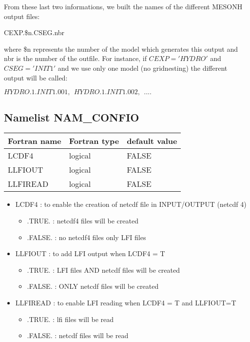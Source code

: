 From these last two informations, we built the names of the different MESONH
output files: 

CEXP.\$n.CSEG.nbr

where \$n represents the number of the model which generates this output and nbr
is the number of the outfile. For instance, if $CEXP='HYDRO'$ and $CSEG='INIT1'$
and we use only  one model (no gridnesting) the different output will be called:

$HYDRO.1.INIT1.001 , \ \ HYDRO.1.INIT1.002, \ \ ....$
\subsection{Namelist NAM\_CONFIO}\label{s:namconfio}

\begin{center}
\begin{tabular} {|l|l|l|}
\hline
Fortran name & Fortran type & default value \\
\hline
LCDF4      & logical  & FALSE  \\
LLFIOUT    & logical  & FALSE  \\
LLFIREAD   & logical  & FALSE  \\
\hline
\end{tabular}
\end{center}

\begin{itemize}

\item
LCDF4 : to enable the creation of netcdf file in INPUT/OUTPUT (netcdf 4)

\begin{itemize}
\item   .TRUE.  : netcdf4 files will be created
\item   .FALSE. : no netcdf4  files only LFI files
\end{itemize}

\item
LLFIOUT : to add LFI output when  LCDF4 = T 

\begin{itemize}
\item   .TRUE.  : LFI files AND  netcdf files will be created
\item   .FALSE. : ONLY netcdf files will be created
\end{itemize}

\item
LLFIREAD : to enable LFI reading when LCDF4 = T and LLFIOUT=T  

\begin{itemize}
\item   .TRUE.  : lfi files will be read
\item   .FALSE. : netcdf files will be read
\end{itemize}


\end{itemize}


